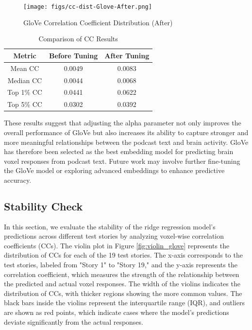 \documentclass[11pt,letterpaper]{article}
\begin{document}
\begin{figure}[h]
    \centering
    \texttt{[image: figs/cc-dist-Glove-After.png]}
    \caption{GloVe Correlation Coefficient Distribution (After)}
    \label{fig:prob_hist_glove}
\end{figure}

\begin{table}[ht]
\centering
\begin{tabular}{|c|c|c|}
\hline
\textbf{Metric} & \textbf{Before Tuning} & \textbf{After Tuning} \\
\hline
Mean CC & 0.0049 & 0.0083 \\
\hline
Median CC & 0.0044 & 0.0068 \\
\hline
Top 1\% CC & 0.0441 & 0.0622 \\
\hline
Top 5\% CC & 0.0302 & 0.0392 \\
\hline
\end{tabular}
\caption{Comparison of CC Results}
\end{table}

These results suggest that adjusting the alpha parameter not only improves the overall performance of GloVe but also increases its ability to capture stronger and more meaningful relationships between the podcast text and brain activity. GloVe has therefore been selected as the best embedding model for predicting brain voxel responses from podcast text. Future work may involve further fine-tuning the GloVe model or exploring advanced embeddings to enhance predictive accuracy.


\vspace{1em} %
\subsection{Stability Check}
\vspace{0.5em} %

In this section, we evaluate the stability of the ridge regression model's predictions across different test stories by analyzing voxel-wise correlation coefficients (CCs). The violin plot in Figure \ref{fig:violin_glove} represents the distribution of CCs for each of the 19 test stories. The x-axis corresponds to the test stories, labeled from "Story 1" to "Story 19," and the y-axis represents the correlation coefficient, which measures the strength of the relationship between the predicted and actual voxel responses. The width of the violins indicates the distribution of CCs, with thicker regions showing the more common values. The black bars inside the violins represent the interquartile range (IQR), and outliers are shown as red points, which indicate cases where the model's predictions deviate significantly from the actual responses.
\end{document}
